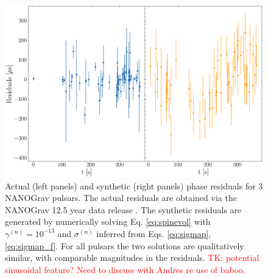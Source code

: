 \documentclass[fleqn,usenatbib,useAMS]{mnras}
\begin{document}
\begin{figure}
	\includegraphics[width=\columnwidth]{images/example_residuals_plot}
	\caption{Actual (left panels) and synthetic (right panels) phase residuals for 3 NANOGrav pulsars. The actual residuals are obtained via the NANOGrav 12.5 year data release \citep{nanograv_narrowband_DR}. The synthetic residuals are generated by numerically solving Eq. \ref{eq:spinevol} with $\gamma^{(n)} = 10^{-13}$ and $\sigma^{(n)}$ inferred from Eqs. \ref{eq:sigmap}, \ref{eq:sigmap_f}. For all pulsars the two solutions are qualitatively similar, with comparable magnitudes in the residuals. \textcolor{red}{TK: potential sinusoidal feature? Need to discuss with Andres re use of baboo.}}
	\label{fig:qualitative_compare}
\end{figure}






%
%	
\end{document}
